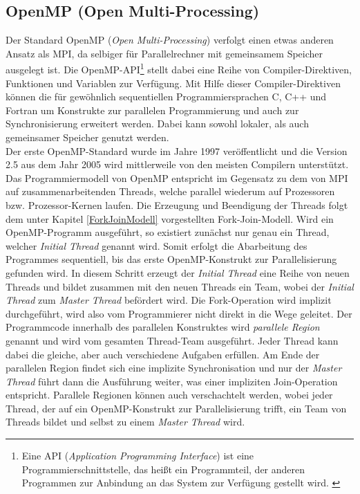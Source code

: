 		\subsection{OpenMP (Open Multi-Processing)}
			\label{OpenMP}
			
			Der Standard OpenMP (\textit{Open Multi-Processing}) verfolgt einen etwas anderen Ansatz als MPI, da selbiger für Parallelrechner mit gemeinsamem Speicher ausgelegt ist. Die OpenMP-API\footnote{Eine API (\textit{Application Programming Interface}) ist eine Programmierschnittstelle, das heißt ein Programmteil, der anderen Programmen zur Anbindung an das System zur Verfügung gestellt wird. \cite{APIWikipedia}} stellt dabei eine Reihe von Compiler-Direktiven, Funktionen und Variablen zur Verfügung. Mit Hilfe dieser Compiler-Direktiven können die für gewöhnlich sequentiellen Programmiersprachen C, C++ und Fortran um Konstrukte zur parallelen Programmierung und auch zur Synchronisierung erweitert werden. Dabei kann sowohl lokaler, als auch gemeinsamer Speicher genutzt werden.\\
			Der erste OpenMP-Standard wurde im Jahre 1997 veröffentlicht und die Version 2.5 aus dem Jahr 2005 wird mittlerweile von den meisten Compilern unterstützt.\\
			Das Programmiermodell von OpenMP entspricht im Gegensatz zu dem von MPI auf zusammenarbeitenden Threads, welche parallel wiederum auf Prozessoren bzw. Prozessor-Kernen laufen. Die Erzeugung und Beendigung der Threads folgt dem unter Kapitel \ref{ForkJoinModell} vorgestellten Fork-Join-Modell. Wird ein OpenMP-Programm ausgeführt, so existiert zunächst nur genau ein Thread, welcher \textit{Initial Thread} genannt wird. Somit erfolgt die Abarbeitung des Programmes sequentiell, bis das erste OpenMP-Konstrukt zur Parallelisierung gefunden wird. In diesem Schritt erzeugt der \textit{Initial Thread} eine Reihe von neuen Threads und bildet zusammen mit den neuen Threads ein Team, wobei der \textit{Initial Thread} zum \textit{Master Thread} befördert wird. Die Fork-Operation wird implizit durchgeführt, wird also vom Programmierer nicht direkt in die Wege geleitet. Der Programmcode innerhalb des parallelen Konstruktes wird \textit{parallele Region} genannt und wird vom gesamten Thread-Team ausgeführt. Jeder Thread kann dabei die gleiche, aber auch verschiedene Aufgaben erfüllen. Am Ende der parallelen Region findet sich eine implizite Synchronisation und nur der \textit{Master Thread} führt dann die Ausführung weiter, was einer impliziten Join-Operation entspricht. Parallele Regionen können auch verschachtelt werden, wobei jeder Thread, der auf ein OpenMP-Konstrukt zur Parallelisierung trifft, ein Team von Threads bildet und selbst zu einem \textit{Master Thread} wird.\\
